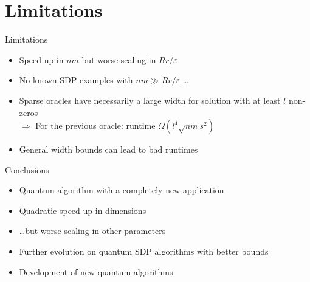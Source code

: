 \section{Limitations}

\begin{frame}{Limitations}

 \begin{itemize}
  \item Speed-up in $nm$ but worse scaling in  $Rr/\varepsilon$
  \item No known SDP examples with $nm \gg  Rr/\varepsilon$ \dots
 \end{itemize}
 
  \vspace{2\floatsep}
  
  \pause
 
 \begin{itemize}
  \item Sparse oracles have necessarily a large width for solution with at least $l$ non-zeros \\ $\Rightarrow$ For the previous oracle: runtime $\Omega( l^4 \sqrt{nm} s^2)$
  \item General width bounds can lead to bad runtimes 
 \end{itemize}


\end{frame}

\begin{frame}{Conclusions}

\begin{itemize}
 \item Quantum algorithm with a completely new application
 \item Quadratic speed-up in dimensions
 \item \dots but worse scaling in other parameters
\end{itemize}

\vspace{\floatsep}

\pause

\begin{itemize}
 \item Further evolution on quantum SDP algorithms with better bounds
 \item Development of new quantum algorithms
\end{itemize}



\end{frame}
